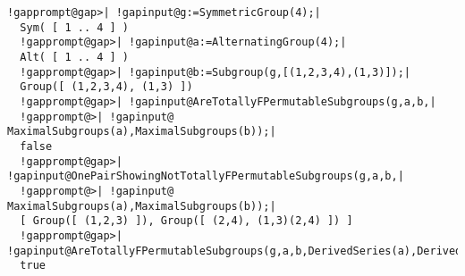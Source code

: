 \documentclass[a4paper,11pt]{report}
\begin{document}
{{{ 
\begin{Verbatim}[commandchars=!@|,fontsize=\small,frame=single,label=Example]
  !gapprompt@gap>| !gapinput@g:=SymmetricGroup(4);|
  Sym( [ 1 .. 4 ] )
  !gapprompt@gap>| !gapinput@a:=AlternatingGroup(4);|
  Alt( [ 1 .. 4 ] )
  !gapprompt@gap>| !gapinput@b:=Subgroup(g,[(1,2,3,4),(1,3)]);|
  Group([ (1,2,3,4), (1,3) ])
  !gapprompt@gap>| !gapinput@AreTotallyFPermutableSubgroups(g,a,b,|
  !gapprompt@>| !gapinput@     MaximalSubgroups(a),MaximalSubgroups(b));|
  false
  !gapprompt@gap>| !gapinput@OnePairShowingNotTotallyFPermutableSubgroups(g,a,b,|
  !gapprompt@>| !gapinput@     MaximalSubgroups(a),MaximalSubgroups(b));|
  [ Group([ (1,2,3) ]), Group([ (2,4), (1,3)(2,4) ]) ]
  !gapprompt@gap>| !gapinput@AreTotallyFPermutableSubgroups(g,a,b,DerivedSeries(a),DerivedSeries(b));|
  true
\end{Verbatim}
 }

 }

 }

 
\end{document}
